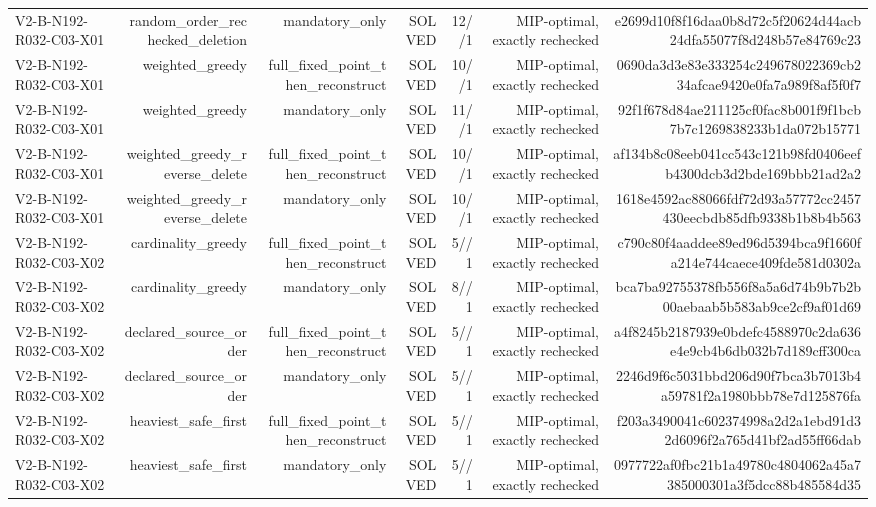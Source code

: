 {\begin{longtable}{lrrrrrr}
V2-B-N192-R032-C03-X01 & random\_order\_rechecked\_deletion & mandatory\_only & SOLVED & 12//1 & MIP-optimal, exactly rechecked & e2699d10f8f16daa0b8d72c5f20624d44acb24dfa55077f8d248b57e84769c23 \\
V2-B-N192-R032-C03-X01 & weighted\_greedy & full\_fixed\_point\_then\_reconstruct & SOLVED & 10//1 & MIP-optimal, exactly rechecked & 0690da3d3e83e333254c249678022369cb234afcae9420e0fa7a989f8af5f0f7 \\
V2-B-N192-R032-C03-X01 & weighted\_greedy & mandatory\_only & SOLVED & 11//1 & MIP-optimal, exactly rechecked & 92f1f678d84ae211125cf0fac8b001f9f1bcb7b7c1269838233b1da072b15771 \\
V2-B-N192-R032-C03-X01 & weighted\_greedy\_reverse\_delete & full\_fixed\_point\_then\_reconstruct & SOLVED & 10//1 & MIP-optimal, exactly rechecked & af134b8c08eeb041cc543c121b98fd0406eefb4300dcb3d2bde169bbb21ad2a2 \\
V2-B-N192-R032-C03-X01 & weighted\_greedy\_reverse\_delete & mandatory\_only & SOLVED & 10//1 & MIP-optimal, exactly rechecked & 1618e4592ac88066fdf72d93a57772cc2457430eecbdb85dfb9338b1b8b4b563 \\
V2-B-N192-R032-C03-X02 & cardinality\_greedy & full\_fixed\_point\_then\_reconstruct & SOLVED & 5//1 & MIP-optimal, exactly rechecked & c790c80f4aaddee89ed96d5394bca9f1660fa214e744caece409fde581d0302a \\
V2-B-N192-R032-C03-X02 & cardinality\_greedy & mandatory\_only & SOLVED & 8//1 & MIP-optimal, exactly rechecked & bca7ba92755378fb556f8a5a6d74b9b7b2b00aebaab5b583ab9ce2cf9af01d69 \\
V2-B-N192-R032-C03-X02 & declared\_source\_order & full\_fixed\_point\_then\_reconstruct & SOLVED & 5//1 & MIP-optimal, exactly rechecked & a4f8245b2187939e0bdefc4588970c2da636e4e9cb4b6db032b7d189cff300ca \\
V2-B-N192-R032-C03-X02 & declared\_source\_order & mandatory\_only & SOLVED & 5//1 & MIP-optimal, exactly rechecked & 2246d9f6c5031bbd206d90f7bca3b7013b4a59781f2a1980bbb78e7d125876fa \\
V2-B-N192-R032-C03-X02 & heaviest\_safe\_first & full\_fixed\_point\_then\_reconstruct & SOLVED & 5//1 & MIP-optimal, exactly rechecked & f203a3490041c602374998a2d2a1ebd91d32d6096f2a765d41bf2ad55ff66dab \\
V2-B-N192-R032-C03-X02 & heaviest\_safe\_first & mandatory\_only & SOLVED & 5//1 & MIP-optimal, exactly rechecked & 0977722af0fbc21b1a49780c4804062a45a7385000301a3f5dcc88b485584d35 \\

\end{longtable}}

